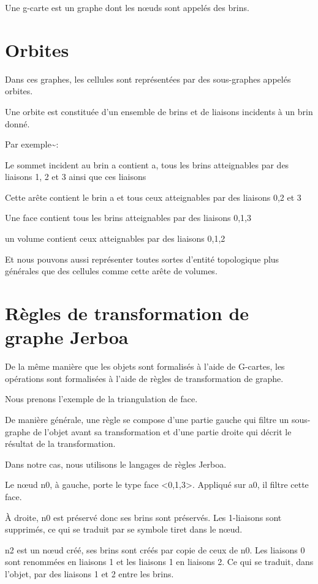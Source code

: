 \documentclass[11pt]{article}
\begin{document}
Une g-carte est un graphe dont les nœuds sont appelés des brins.
\section{Orbites}
\label{sec:org99b57a4}
Dans ces graphes, les cellules sont représentées par des sous-graphes appelés
orbites.

Une orbite est constituée d'un ensemble de brins et de liaisons incidents à un
brin donné.

Par exemple\textasciitilde{}:

Le sommet incident au brin a contient a, tous les brins atteignables par des
liaisons 1, 2 et 3 ainsi que ces liaisons

Cette arête contient le brin a et tous ceux atteignables par des liaisons 0,2 et
3

Une face contient tous les brins atteignables par des liaisons 0,1,3

un volume contient ceux atteignables par des liaisons 0,1,2

Et nous pouvons aussi représenter toutes sortes d'entité topologique plus
générales que des cellules comme cette arête de volumes.
\section{Règles de transformation de graphe Jerboa}
\label{sec:org89fe9a5}

De la même manière que les objets sont formalisés à l'aide de G-cartes, les
opérations sont formalisées à l'aide de règles de transformation de graphe.

Nous prenons l'exemple de la triangulation de face.

De manière générale, une règle se compose d'une partie gauche qui filtre un
sous-graphe de l'objet avant sa transformation et d'une partie droite qui décrit
le résultat de la transformation.

Dans notre cas, nous utilisons le langages de règles Jerboa.

Le nœud n0, à gauche, porte le type face <0,1,3>. Appliqué sur a0, il filtre
cette face.

À droite, n0 est préservé donc ses brins sont préservés. Les 1-liaisons sont
supprimés, ce qui se traduit par se symbole tiret dans le nœud.

n2 est un nœud créé, ses brins sont créés par copie de ceux de n0. Les liaisons
0 sont renommées en liaisons 1 et les liaisons 1 en liaisons 2. Ce qui se
traduit, dans l'objet, par des liaisons 1 et 2 entre les brins.
\end{document}
